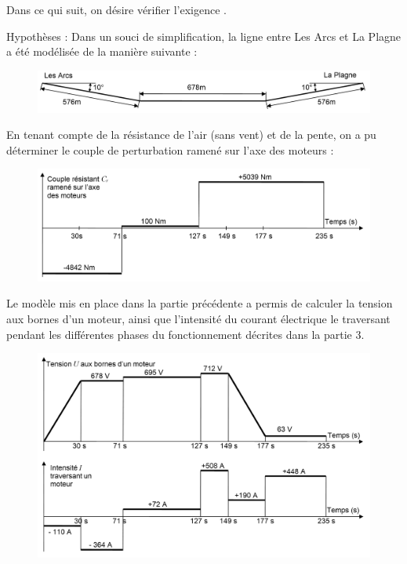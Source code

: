 Dans ce qui suit, on désire vérifier l'exigence  \fg.

Hypothèses : Dans un souci de simplification, la ligne entre \og Les Arcs \fg et \og La Plagne \fg a été modélisée de la manière suivante :

\begin{figure}[!h]
\centering
\includegraphics[width=0.8\linewidth]{img/fig30}
\label{fig30}
\end{figure}

En tenant compte de la résistance de l'air (sans vent) et de la pente, on a pu déterminer le couple de perturbation ramené sur l'axe des moteurs :

\begin{figure}[!h]
\centering
\includegraphics[width=0.8\linewidth]{img/fig31}
\label{fig31}
\end{figure}

Le modèle mis en place dans la partie précédente a permis de calculer la tension aux bornes d'un moteur, ainsi que l'intensité du courant électrique le traversant pendant les différentes phases du fonctionnement décrites dans la partie 3.

\begin{figure}[!h]
\centering
\includegraphics[width=0.8\linewidth]{img/fig32}
\label{fig32}
\end{figure}

